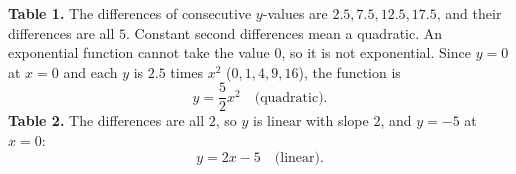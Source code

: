 \textbf{Table 1.} The differences of consecutive $y$-values are $2.5,7.5,12.5,17.5$, and their differences are all $5$. Constant second differences mean a quadratic. An exponential function cannot take the value $0$, so it is not exponential. Since $y=0$ at $x=0$ and each $y$ is $2.5$ times $x^2$ ($0,1,4,9,16$), the function is
\[
\boxed{y=\dfrac{5}{2}x^2}\quad\text{(quadratic)}.
\]
\textbf{Table 2.} The differences are all $2$, so $y$ is linear with slope $2$, and $y=-5$ at $x=0$:
\[
\boxed{y=2x-5}\quad\text{(linear)}.
\]
